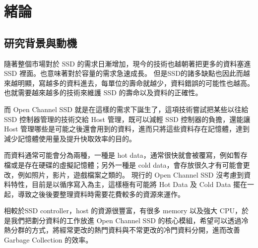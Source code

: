 \chapter{緒論}
\section{研究背景與動機}
\indent
隨著整個市場對於 SSD 的需求日漸增加，現今的技術也越朝著把更多的資料塞進 SSD 裡面。也意味著對於容量的需求急速成長。
但是SSD的諸多缺點也因此而越來越明顯，寫越多的資料進去，每單位的壽命就越少，資料錯誤的可能性也越高。
也就需要越來越多的技術來維護 SSD 的壽命以及資料的正確性。

而 Open Channel SSD 就是在這樣的需求下誕生了，這項技術嘗試把某些以往給 SSD 控制器管理的技術交給 Host 管理，既可以減輕 SSD 控制器的負擔，還能讓 Host 管理哪些是可能之後還會用到的資料，進而只將這些資料存在記憶體，達到減少記憶體使用量及提升快取效率的目的。

而資料通常可能會分為兩種，一種是 hot data，通常很快就會被覆寫，例如暫存檔或是存在硬碟的虛擬記憶體；另外一種是 cold data，會存放很久才有可能會更改，例如照片，影片，遊戲檔案之類的。
現行的 Open Channel SSD 沒考慮到資料特性，目前是以循序寫入為主，這樣極有可能將 Hot Data 及 Cold Data 擺在一起，導致之後後要整理資料時需要花費較多的資源來運作。

相較於SSD controller，host 的資源很豐富，有很多 memory 以及強大 CPU，於是我們把劃分資料的工作放進 Open Channel SSD 的核心模組，希望可以透過冷熱分群的方式，將經常更改的熱門資料與不常更改的冷門資料分開，進而改善 Garbage Collection 的效率。




